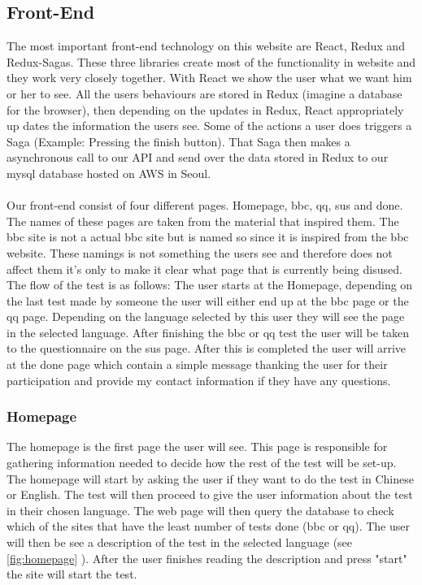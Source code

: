 \subsection{Front-End}
The most important front-end technology on this website are React, Redux and Redux-Sagas. These three libraries create most of the functionality in website and they work very closely together. With React we show the user what we want him or her to see. All the users behaviours are stored in Redux (imagine a database for the browser), then depending on the updates in Redux, React appropriately up dates the information the users see. Some of the actions a user does triggers a Saga (Example: Pressing the finish button). That Saga then makes a asynchronous call to our API and send over the data stored in Redux to our mysql database hosted on AWS in Seoul. 
\\\\
Our front-end consist of four different pages. Homepage, bbc, qq, sus and done. The names of these pages are taken from the material that inspired them. The bbc site is not a actual bbc site but is named so since it is inspired from the bbc website. These namings is not something the users see and therefore does not affect them it's only to make it clear what page that is currently being disused. The flow of the test is as follows: The user starts at the Homepage, depending on the last test made by someone the user will either end up at the bbc page or the qq page. Depending on the language selected by this user they will see the page in the selected language. After finishing the bbc or qq test the user will be taken to the questionnaire on the sus page. After this is completed the user will arrive at the done page which contain a simple message thanking the user for their participation and provide my contact information if they have any questions. 

\subsubsection{Homepage}
The homepage is the first page the user will see. This page is responsible for gathering information needed to decide how the rest of the test will be set-up. The homepage will start by asking the user if they want to do the test in Chinese or English. The test will then proceed to give the user information about the test in their chosen language. The web page will then query the database to check which of the sites that have the least number of tests done (bbc or qq). The user will then be see a description of the test in the selected language (see \ref{fig:homepage} ). After the user finishes reading the description and press "start" the site will start the test.

